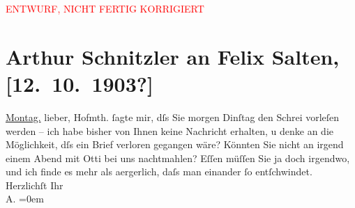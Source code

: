 
\begin{center}
            \textcolor{red}{ENTWURF, NICHT FERTIG KORRIGIERT}
                      \end{center}
            
         
         \renewcommand{\erwaehntePersonen}{Personen: Hugo von Hofmannsthal, Felix Salten, Ottilie Salten}
         \renewcommand{\erwaehnteOrte}{Orte: Wien}
         \renewcommand{\erwaehnteWerke}{Werke: Der Schrei der Liebe. Novelle}
               \section[Arthur Schnitzler an Felix Salten, {[}12. 10. 1903?{]}]{ Arthur Schnitzler an Felix Salten, {[}12. 10. 1903?{]}}\nopagebreak{}\rehead{ }\begin{ledgroupsized}[t]{13cm}\normalsize\beginnumbering \toendnotes[C]{\smallbreak\pagebreak[2]} 
\pstart
           \raggedleft{}{\pb}\uline{Montag.}\pend
           \pstart
           lieber, Hofmth. ſagte mir, dſs Sie morgen
                  Dinſtag den Schrei vorleſen
               werden – ich habe bisher von Ihnen keine Nachricht erhalten, u denke an die
               Möglichkeit, dſs ein {\pb}Brief verloren gegangen
               wäre? \pend
           \pstart
           Könnten Sie nicht an irgend einem Abend mit Otti bei uns nachtmahlen? Eſſen müſſen Sie ja doch irgendwo, und ich finde
               es mehr als aergerlich, {\pb}daſs man einander ſo
               entſchwindet. \pend
           \pstart
           Herzlichſt Ihr {\\[\baselineskip]}\spacefill\mbox{A.}\pend
           \leftskip=0em{}
         
         \endnumbering{}\end{ledgroupsized}\begin{anhang}\end{anhang}\newcommand{\dateiname}{L02986}\newcommand{\titel}{Arthur Schnitzler an Felix Salten, [12. 10. 1903?]}\newcommand{\editorInnen}{Martin Anton Müller und Laura Untner}
      